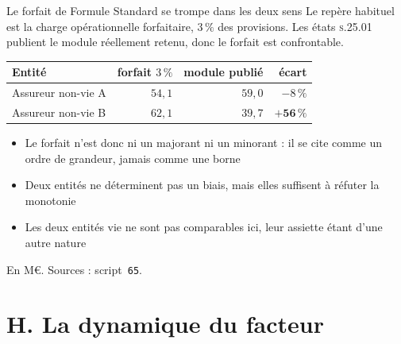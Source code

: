\documentclass[11pt]{beamer}
\begin{document}
\begin{frame}{Le forfait de Formule Standard se trompe dans les deux sens}
\small
Le repère habituel est la charge opérationnelle forfaitaire, $3\,\%$ des provisions. Les états
\textsc{s.25.01} publient le module réellement retenu, donc le forfait est confrontable.
\vspace{1mm}

\begin{center}\small
\begin{tabular}{@{}l r r r@{}}
\toprule
\textbf{Entité} & \textbf{forfait $3\,\%$} & \textbf{module publié} & \textbf{écart} \\
\midrule
Assureur non-vie A & $54{,}1$ & $59{,}0$ & $-8\,\%$ \\
Assureur non-vie B & $62{,}1$ & $39{,}7$ & $\mathbf{+56\,\%}$ \\
\bottomrule
\end{tabular}
\end{center}
\vspace{2mm}

\begin{itemize}\itemsep4pt
  \item \alert{Le forfait n'est donc ni un majorant ni un minorant} : il se cite comme un ordre
        de grandeur, jamais comme une borne
  \item Deux entités ne déterminent pas un biais, mais elles suffisent à réfuter la monotonie
  \item Les deux entités vie ne sont pas comparables ici, leur assiette étant d'une autre nature
\end{itemize}
\vspace{1mm}
{\scriptsize En M\euro. Sources : script~\texttt{65}.}
\end{frame}

\section*{H. La dynamique du facteur}
\end{document}
